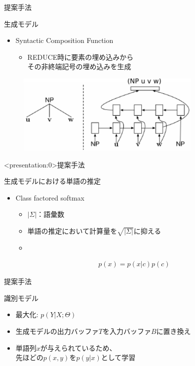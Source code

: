 \documentclass[aspectratio=43,unicode,10pt]{beamer}
\newcommand{\nt}{非終端記号}
\begin{document}
\begin{frame}{提案手法}
  \begin{block}{生成モデル}
    \begin{itemize}
      \item Syntactic Composition Function
        \begin{itemize}
          \item REDUCE時に要素の埋め込みから\\その\nt の埋め込みを生成
        \end{itemize}
    \end{itemize}
    \begin{figure}
      \includegraphics[width=0.8\textwidth]{fig/fig_6.pdf}
    \end{figure}
  \end{block}
\end{frame}

\begin{frame}<presentation:0>{提案手法}
  \begin{block}{生成モデルにおける単語の推定}
    \begin{itemize}
      \item Class factored softmax
        \begin{itemize}
          \item $|\Sigma|$：語彙数
          \item 単語の推定において計算量を$\sqrt{|\Sigma|}$に抑える
          \item
        \end{itemize}
        \begin{gather*}
          p(x) = p(x|c)p(c)
        \end{gather*}
    \end{itemize}
  \end{block}
\end{frame}

\begin{frame}{提案手法}
  \begin{block}{識別モデル}
    \begin{itemize}
      \item 最大化: $p(Y | X; \Theta)$
      \item 生成モデルの出力バッファ$T$を入力バッファ$B$に置き換え
      \item 単語列$x$が与えられているため、 \\
            先ほどの$p(x, y)$を$p(y|x)$として学習
    \end{itemize}
  \end{block}
\end{frame}
\end{document}

